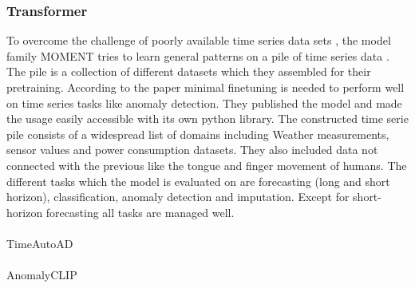 \subsubsection{Transformer}
To overcome the challenge of poorly available time series data sets \cite{ma_survey_2023}, the model family MOMENT tries to learn general patterns on a pile of time series data \cite{goswami_moment_2024}. The pile is a collection of different datasets which they assembled for their pretraining. According to the paper minimal finetuning is needed to perform well on time series tasks like anomaly detection. They published the model and made the usage easily accessible with its own python library. The constructed time serie pile consists of a widespread list of domains including Weather measurements, sensor values and power consumption datasets. They also included data not connected with the previous like the tongue and finger movement of humans. The different tasks which the model is evaluated on are forecasting (long and short horizon), classification, anomaly detection and imputation. Except for short-horizon forecasting all tasks are managed well. \\\\
\cite{jiao_timeautoad_2022} TimeAutoAD\\\\ %
\cite{zhou_anomalyclip_2024} AnomalyCLIP\\\\ %
\cite{li_anomaly_2024} \\\\ %
